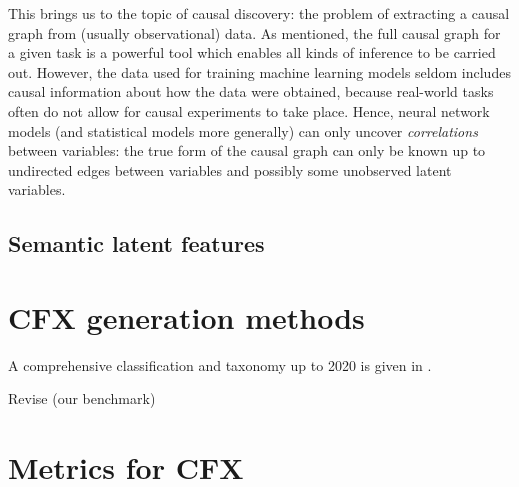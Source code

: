\documentclass[../main.tex]{subfiles}
\begin{document}
This brings us to the topic of causal discovery: the problem of extracting a causal graph from (usually observational) data.
As mentioned, the full causal graph for a given task is a powerful tool which enables all kinds of inference to be carried out. However, the data used for training machine learning models seldom includes causal information about how the data were obtained, because real-world tasks often do not allow for causal experiments to take place.
Hence, neural network models (and statistical models more generally) can only uncover \emph{correlations} between variables: the true form of the causal graph can only be known up to undirected edges between variables and possibly some unobserved latent variables.
\notecite{}

\subsection{Semantic latent features}






\section{CFX generation methods}

A comprehensive classification and taxonomy up to 2020 is given in \cite{vermaCounterfactual2020}.



Revise (our benchmark)

\section{Metrics for CFX}
\end{document}
